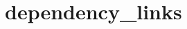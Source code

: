 \chapter{dependency\+\_\+links}
\hypertarget{md_dirac__solver_8egg-info_2dependency__links}{}\label{md_dirac__solver_8egg-info_2dependency__links}
